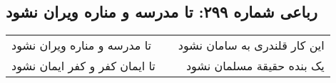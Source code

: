 \begin{center}
\section*{رباعی شماره ۲۹۹: تا مدرسه و مناره ویران نشود}
\label{sec:sh299}
\begin{longtable}{l p{0.5cm} r}
تا مدرسه و مناره ویران نشود
&&
این کار قلندری به سامان نشود
\\
تا ایمان کفر و کفر ایمان نشود
&&
یک بنده حقیقة مسلمان نشود
\\
\end{longtable}
\end{center}
